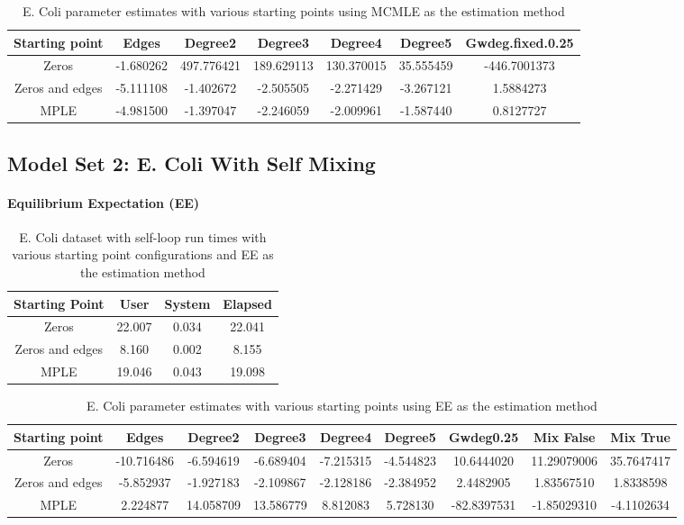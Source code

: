 \begin{table}[H]
\centering
\scriptsize
\begin{tabular}{|| c | c | c | c | c | c | c ||}
\hline
Starting point & Edges & Degree2 & Degree3 & Degree4 & Degree5 & Gwdeg.fixed.0.25 \\
\hline
Zeros & -1.680262 & 497.776421 & 189.629113 & 130.370015 & 35.555459 & -446.7001373 \\
\hline
Zeros and edges & -5.111108 & -1.402672 & -2.505505 & -2.271429 & -3.267121 & 1.5884273 \\
\hline
MPLE & -4.981500 & -1.397047 & -2.246059 & -2.009961 & -1.587440 & 0.8127727 \\
\hline
\end{tabular}
\label{t:params_ecoli_mcmle}
\caption{E. Coli parameter estimates with various starting points using MCMLE as the estimation method}
\end{table}

\subsection{Model Set 2: E. Coli With Self Mixing}

\paragraph{Equilibrium Expectation (EE)}

\begin{table}[H]
\centering
 \begin{tabular}{|| c | c | c | c||} 
 \hline
 Starting Point & User & System & Elapsed \\
 \hline\hline
 Zeros & 22.007	 & 0.034 & 22.041 \\ 
 \hline
 Zeros and edges & 8.160 & 0.002 & 8.155 \\
 \hline
 MPLE & 19.046 & 0.043 & 19.098 \\
 \hline
 \end{tabular}
 \label{t:ecoli2_ee}
 \caption{E. Coli dataset with self-loop run times with various starting point configurations and EE as the estimation method}
\end{table}


\begin{table}[H]
\centering
\scriptsize
\begin{tabular}{|| c | c | c | c | c | c | c | c | c ||}
\hline
Starting point & Edges & Degree2 & Degree3 & Degree4 & Degree5 & Gwdeg0.25 & Mix False & Mix True \\
\hline
Zeros & -10.716486 & -6.594619 & -6.689404 & -7.215315 & -4.544823 & 10.6444020 & 11.29079006 & 35.7647417 \\
\hline
Zeros and edges & -5.852937 & -1.927183 &-2.109867 & -2.128186 & -2.384952 & 2.4482905 & 1.83567510 & 1.8338598 \\
\hline
MPLE & 2.224877	& 14.058709 & 13.586779 & 8.812083 & 5.728130 & -82.8397531 & -1.85029310 & -4.1102634 \\
\hline
\end{tabular}
\label{t2:params_ecoli_ee}
\caption{E. Coli parameter estimates with various starting points using EE as the estimation method}
\end{table}


